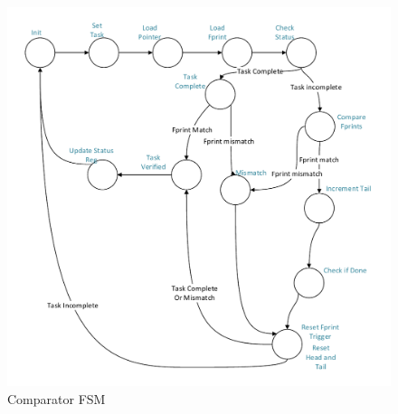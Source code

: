 \begin{figure}[ht]
\includegraphics{Figures/comp_fsm}
\caption{Comparator FSM}
\label{f:comp_fsm}
\end{figure}


